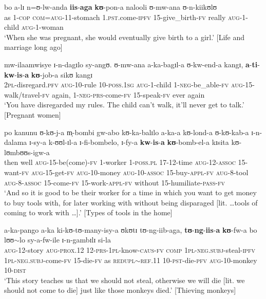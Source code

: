 \begin{exe}

\ex \gll bo a-lɪ n=ʊ-lw-anda \textbf{iis}-\textbf{aga} \textbf{kʊ}-pon-a nalooli ʊ-mw-ana ʊ-n-kiikʊlʊ\\
as 1-\textsc{cop} \textsc{com}=\textsc{aug}-11-stomach 1.\textsc{pst}.come-\textsc{ipfv} 15-give\_birth-\textsc{fv} really \textsc{aug}-1-child \textsc{aug}-1-woman\\
\glt \lq When she was pregnant, she would eventually give birth to a girl.' [Life and marriage long ago]

\ex \label{exIsaAuxNegPRS}\gll mw-ilaamwisye ɪ-n-dagɪlo sy-angʊ. ʊ-mw-ana a-ka-bagɪl-a ʊ-kw-end-a kangɪ, \textbf{a}-\textbf{ti}-\textbf{kw}-\textbf{is}-\textbf{a} \textbf{kʊ}-job-a sikʊ kangɪ\\
\textsc{2pl}-disregard.\textsc{pfv} \textsc{aug}-10-rule 10-\textsc{poss.1sg} \textsc{aug}-1-child 1-\textsc{neg}-be\_able-\textsc{fv} \textsc{aug}-15-walk/travel-\textsc{fv} again, 1-\textsc{neg}-\textsc{prs}-come-\textsc{fv} 15-speak-\textsc{fv} ever again\\
\glt `You have disregarded my rules. The child can't walk, it'll never get to talk.' [Pregnant women]

\ex \gll po kanunu ʊ-kʊ-j-a m̩-bombi gw-abo kʊ-ka-balɪlo a-ka-a kʊ-lond-a ʊ-kʊ-kab-a ɪ-n-dalama ɪ-sy-a k-ʊʊl-ɪl-a ɪ-fi-bombelo, ɪ-fy-a \textbf{kw}-\textbf{is}-\textbf{a} \textbf{kʊ}-bomb-el-a kɪsita kʊ-lʊmbʊʊs-igw-a\\
then well \textsc{aug}-15-be(come)-\textsc{fv} 1-worker 1-\textsc{poss.pl} 17-12-time \textsc{aug}-12-\textsc{assoc} 15-want-\textsc{fv} \textsc{aug}-15-get-\textsc{fv} \textsc{aug}-10-money \textsc{aug}-10-\textsc{assoc} 15-buy-\textsc{appl}-\textsc{fv} \textsc{aug}-8-tool \textsc{aug}-8-\textsc{assoc} 15-come-\textsc{fv} 15-work-\textsc{appl}-\textsc{fv} without 15-humiliate-\textsc{pass}-\textsc{fv}\\%
\glt \lq ‎‎And so it is good to be their worker for a time in which you want to get money to buy tools with, for later working with without being disparaged [lit. \ldots tools of coming to work with \ldots].' [Types of tools in the home]

\ex \gll a-ka-pango a-ka ki-kʊ-tʊ-many-isy-a ʊkʊtɪ tʊ-ng-iib-aga, \textbf{tʊ}-\textbf{ng}-\textbf{iis}-\textbf{a} \textbf{kʊ}-fw-a bo lʊʊ$\sim$lo sy-a-fw-ile ɪ-n-gambɪlɪ si-la\\
\textsc{aug}-12-story \textsc{aug}-\textsc{prox.12} 12-\textsc{prs}-\textsc{1pl}-know-\textsc{caus}-\textsc{fv} \textsc{comp} \textsc{1pl}-\textsc{neg.subj}-steal-\textsc{ipfv} \textsc{1pl}-\textsc{neg.subj}-come-\textsc{fv} 15-die-\textsc{fv} as \textsc{redupl}$\sim$\textsc{ref.11} 10-\textsc{pst}-die-\textsc{pfv} \textsc{aug}-10-monkey 10-\textsc{dist}\\
\glt `This story teaches us that we should not steal, otherwise we will die [lit. we should not come to die] just like those monkeys died.' [Thieving monkeys]
\end{exe}

